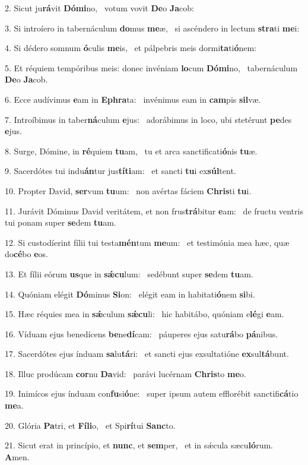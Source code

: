 2. Sicut ju\textbf{rá}vit \textbf{Dó}\textbf{mi}no, \ast\  votum vovit \textbf{De}o \textbf{Ja}cob:\

3. Si introíero in tabernáculum \textbf{do}mus \textbf{me}æ, \ast\  si ascéndero in lectum \textbf{stra}ti \textbf{me}i:\

4. Si dédero somnum \textbf{ó}culis \textbf{me}is, \ast\  et pálpebris meis dormi\textbf{ta}ti\textbf{ó}nem:\

5. Et réquiem tempóribus meis: donec invéniam \textbf{lo}cum \textbf{Dó}\textbf{mi}no, \ast\  tabernáculum \textbf{De}o \textbf{Ja}cob.\

6. Ecce audívimus \textbf{e}am in \textbf{E}\textbf{phra}ta: \ast\  invénimus eam in \textbf{cam}pis \textbf{sil}væ.\

7. Introíbimus in taber\textbf{ná}culum \textbf{e}jus: \ast\  adorábimus in loco, ubi stetérunt \textbf{pe}des \textbf{e}jus.\

8. Surge, Dómine, in \textbf{ré}quiem \textbf{tu}am, \ast\  tu et arca sanctificati\textbf{ó}nis \textbf{tu}æ.\

9. Sacerdótes tui indu\textbf{án}tur jus\textbf{tí}\textbf{ti}am: \ast\  et sancti \textbf{tu}i ex\textbf{súl}tent.\

10. Propter David, \textbf{ser}vum \textbf{tu}um: \ast\  non avértas fáciem \textbf{Chris}ti \textbf{tu}i.\

11. Jurávit Dóminus David veritátem, et non frus\textbf{trá}bitur \textbf{e}am: \ast\  de fructu ventris tui ponam super \textbf{se}dem \textbf{tu}am.\

12. Si custodíerint fílii tui testa\textbf{mén}tum \textbf{me}um: \ast\  et testimónia mea hæc, quæ do\textbf{cé}bo \textbf{e}os.\

13. Et fílii eórum \textbf{us}que in \textbf{sǽ}\textbf{cu}lum: \ast\  sedébunt super \textbf{se}dem \textbf{tu}am.\

14. Quóniam elégit \textbf{Dó}minus \textbf{Si}on: \ast\  elégit eam in habitati\textbf{ó}nem \textbf{si}bi.\

15. Hæc réquies mea in \textbf{sǽ}culum \textbf{sǽ}\textbf{cu}li: \ast\  hic habitábo, quóniam e\textbf{lé}gi \textbf{e}am.\

16. Víduam ejus benedícens \textbf{be}ne\textbf{dí}cam: \ast\  páuperes ejus satu\textbf{rá}bo \textbf{pá}nibus.\

17. Sacerdótes ejus índuam \textbf{sa}lu\textbf{tá}ri: \ast\  et sancti ejus exsultatióne \textbf{ex}sul\textbf{tá}bunt.\

18. Illuc prodúcam \textbf{cor}nu \textbf{Da}vid: \ast\  parávi lucérnam \textbf{Chris}to \textbf{me}o.\

19. Inimícos ejus índuam con\textbf{fu}si\textbf{ó}ne: \ast\  super ipsum autem efflorébit sanctifi\textbf{cá}tio \textbf{me}a.\

20. Glória \textbf{Pa}tri, et \textbf{Fí}\textbf{li}o, \ast\  et Spi\textbf{rí}tui \textbf{Sanc}to.\

21. Sicut erat in princípio, et \textbf{nunc}, et \textbf{sem}per, \ast\  et in sǽcula sæcu\textbf{ló}rum. \textbf{A}men.\

